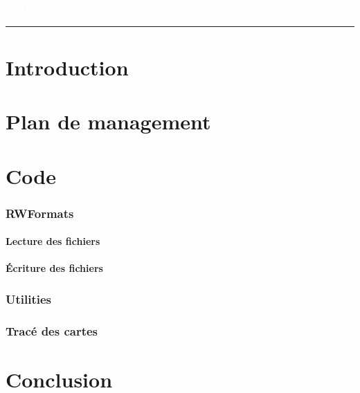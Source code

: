 \documentclass[11p, a4papert]{article}
\author{%
    Anthony Delannoy \\
    \texttt{anthony.delannoy@etu.enseeiht.fr}\vspace{40pt} \\
    Benoit Madiot \\
    \texttt{benoit.madiot@etu.enseeiht.fr}\vspace{40pt} \\
    Jérôme Combaniere \\
    \texttt{jerome.combaniere@etu.enseeiht.fr} 
    }
\makeatletter
\def\printauthor{%
    {\large \@author}}
\makeatother
\begin{document}
\begin{titlepage}
\BgThispage
{}
\vspace*{0.4\textheight}
\noindent
\textcolor{white}{\huge\textbf{\textsf{Méthode de lissage appliquées aux trajectoires ARGOS}}}
\vspace*{3cm}\par
\noindent
\begin{minipage}{0.5\linewidth}
    \begin{flushright}
        \printauthor
    \end{flushright}
\end{minipage} \hspace{15pt}
%
\begin{minipage}{0.02\linewidth}
    \rule{1pt}{175pt}
\end{minipage} \hspace{-10pt}
%
\begin{minipage}{0.63\linewidth}
\vspace{5pt}
    \begin{abstract} 
\lipsum[1]
    \end{abstract}
\end{minipage}
\end{titlepage}
\restoregeometry

\newpage
\thispagestyle{empty}
\tableofcontents
\newpage


\part{Introduction}
\part{Plan de management} %
\part{Code}
\section{RWFormats}
\subsection{Lecture des fichiers}
\subsection{Écriture des fichiers} %
\section{Utilities}
\section{Tracé des cartes}
\part{Conclusion}
\end{document}
